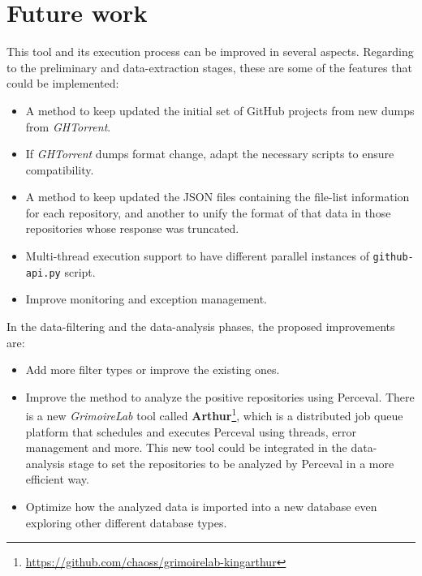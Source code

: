 \documentclass[a4paper, 12pt]{book}
\begin{document}
\section{Future work}
\label{sec:future-work}
This tool and its execution process can be improved in several aspects. Regarding to the preliminary and data-extraction
stages, these are some of the features that could be implemented:
\begin{itemize}
    \item A method to keep updated the initial set of GitHub projects from new dumps from \emph{GHTorrent}.
    \item If \emph{GHTorrent} dumps format change, adapt the necessary scripts to ensure compatibility.
    \item A method to keep updated the JSON files containing the file-list information for
    each repository, and another to unify the format of that data in those repositories whose response was truncated.
    \item Multi-thread execution support to have different parallel instances of \texttt{github-api.py} script.
    \item Improve monitoring and exception management.
\end{itemize}
In the data-filtering and the data-analysis phases, the proposed improvements are:
\begin{itemize}
    \item Add more filter types or improve the existing ones.
    \item Improve the method to analyze the positive repositories using Perceval. There is a new \emph{GrimoireLab}
    tool called \textbf{Arthur}\footnote{\url{https://github.com/chaoss/grimoirelab-kingarthur}},
    which is a distributed job queue platform that schedules and executes Perceval using threads, error management and more.
    This new tool could be integrated in the data-analysis stage to set the repositories to be analyzed by Perceval
    in a more efficient way.
    \item Optimize how the analyzed data is imported into a new database even exploring other different database types.
\end{itemize}
\end{document}
